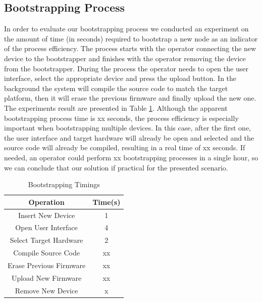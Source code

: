 \documentclass{sig-alternate-05-2015}
\begin{document}
\subsection{Bootstrapping Process}
In order to evaluate our bootstrapping process we conducted an experiment on the amount of time (in seconds) required to bootstrap a new node as an indicator of the process efficiency. The process starts with the operator connecting the new device to the bootstrapper and finishes with the operator removing the device from the bootstrapper. During the process the operator needs to open the user interface, select the appropriate device and press the upload button. In the background the system will compile the source code to match the target platform, then it will erase the previous firmware and finally upload the new one. The experiments result are presented in Table \ref{tab:bootstrapping_time}. Although the apparent bootstrapping process time is xx seconds, the process efficiency is especially important when bootstrapping multiple devices. In this case, after the first one, the user interface and target hardware will already be open and selected and the source code will already be compiled, resulting in a real time of xx seconds. If needed, an operator could perform xx bootstrapping processes in a single hour, so we can conclude that our solution if practical for the presented scenario.

\begin{table}
\centering
\caption{Bootstrapping Timings}
\label{tab:bootstrapping_time}
\begin{tabular}{|c|c|} \hline
Operation&Time(s)\\ \hline
Insert New Device&1\\ \hline
Open User Interface&4\\ \hline
Select Target Hardware&2\\ \hline
Compile Source Code&xx\\ \hline
Erase Previous Firmware&xx\\ \hline
Upload New Firmware&xx\\ \hline
Remove New Device&x\\ 
\hline\end{tabular}
\end{table}
\end{document}
